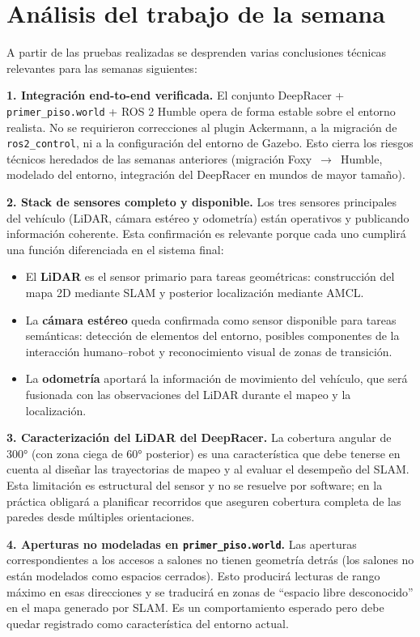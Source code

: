 \documentclass[12pt,letterpaper]{article}
\begin{document}
\section{Análisis del trabajo de la semana}

A partir de las pruebas realizadas se desprenden varias conclusiones técnicas relevantes para las semanas siguientes:

\textbf{1. Integración end-to-end verificada.} El conjunto DeepRacer + \texttt{primer\_piso.world} + ROS 2 Humble opera de forma estable sobre el entorno realista. No se requirieron correcciones al plugin Ackermann, a la migración de \texttt{ros2\_control}, ni a la configuración del entorno de Gazebo. Esto cierra los riesgos técnicos heredados de las semanas anteriores (migración Foxy~$\rightarrow$~Humble, modelado del entorno, integración del DeepRacer en mundos de mayor tamaño).

\textbf{2. Stack de sensores completo y disponible.} Los tres sensores principales del vehículo (LiDAR, cámara estéreo y odometría) están operativos y publicando información coherente. Esta confirmación es relevante porque cada uno cumplirá una función diferenciada en el sistema final:

\begin{itemize}
    \item El \textbf{LiDAR} es el sensor primario para tareas geométricas: construcción del mapa 2D mediante SLAM y posterior localización mediante AMCL.
    \item La \textbf{cámara estéreo} queda confirmada como sensor disponible para tareas semánticas: detección de elementos del entorno, posibles componentes de la interacción humano--robot y reconocimiento visual de zonas de transición.
    \item La \textbf{odometría} aportará la información de movimiento del vehículo, que será fusionada con las observaciones del LiDAR durante el mapeo y la localización.
\end{itemize}

\textbf{3. Caracterización del LiDAR del DeepRacer.} La cobertura angular de 300° (con zona ciega de 60° posterior) es una característica que debe tenerse en cuenta al diseñar las trayectorias de mapeo y al evaluar el desempeño del SLAM. Esta limitación es estructural del sensor y no se resuelve por software; en la práctica obligará a planificar recorridos que aseguren cobertura completa de las paredes desde múltiples orientaciones.

\textbf{4. Aperturas no modeladas en \texttt{primer\_piso.world}.} Las aperturas correspondientes a los accesos a salones no tienen geometría detrás (los salones no están modelados como espacios cerrados). Esto producirá lecturas de rango máximo en esas direcciones y se traducirá en zonas de ``espacio libre desconocido'' en el mapa generado por SLAM. Es un comportamiento esperado pero debe quedar registrado como característica del entorno actual.
\end{document}
